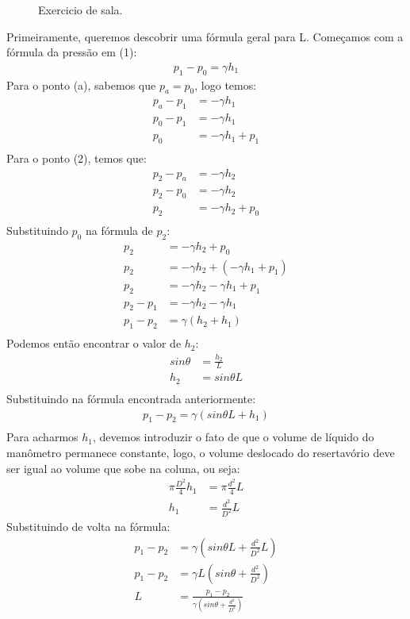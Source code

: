 \documentclass{article}
\begin{document}
\begin{figure}[!h]
     \centering
     \def\svgwidth{0.4\textwidth}
     
     \caption{\label{fig:exercicioSala} Exercicio de sala.}
     \hfill
\end{figure}
Primeiramente, queremos descobrir uma fórmula geral para L. Começamos com a fórmula da pressão em (1):
\begin{align*}
     p_1-p_0=\gamma h_1
\end{align*}
Para o ponto (a), sabemos que $p_a=p_0$, logo temos:
\begin{align*}
     p_a-p_1&=-\gamma h_1\\
     p_0-p_1&=-\gamma h_1\\
     p_0&=-\gamma h_1+p_1\\
\end{align*}
Para o ponto (2), temos que:
\begin{align*}
     p_2-p_a&=-\gamma h_2\\
     p_2-p_0&=-\gamma h_2\\
     p_2&=-\gamma h_2+p_0\\
\end{align*}
Substituindo $p_0$ na fórmula de $p_2$:
\begin{align*}
     p_2&=-\gamma h_2+p_0\\
     p_2&=-\gamma h_2+(-\gamma h_1+p_1)\\  
     p_2&=-\gamma h_2-\gamma h_1+p_1\\           
     p_2-p_1&=-\gamma h_2-\gamma h_1\\
     p_1-p_2&=\gamma(h_2+h_1)\\
\end{align*}
Podemos então encontrar o valor de $h_2$:
\begin{align*}
     sin\theta&=\frac{h_2}{L}\\
     h_2&=sin\theta L\\
\end{align*}
Substituindo na fórmula encontrada anteriormente:
\begin{align*}
     p_1-p_2=\gamma(sin\theta L + h_1)\\
\end{align*}
Para acharmos $h_1$, devemos introduzir o fato de que o volume de líquido do manômetro permanece constante, logo, o volume deslocado do resertavório deve ser igual ao volume que sobe na coluna, ou seja:
\begin{align*}
     \pi \frac{D^2}{4}h_1&=\pi \frac{d^2}{4}L\\
     h_1&=\frac{d^2}{D^2}L
\end{align*}
Substituindo de volta na fórmula:
\begin{align*}
     p_1-p_2&=\gamma\left(sin\theta L + \frac{d^2}{D^2}L\right)\\
     p_1-p_2&=\gamma L\left(sin\theta + \frac{d^2}{D^2}\right)\\
     L&=\frac{p_1-p_2}{\gamma\left(sin\theta + \frac{d^2}{D^2}\right)}\\
\end{align*}
\end{document}
